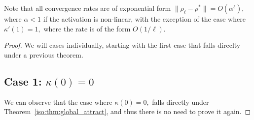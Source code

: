 \begin{remark}
Note that all convergence rates are of exponential form $\|\rho_\ell-\rho^*\|= O(\alpha^\ell),$ where $\alpha<1$ if the activation is non-linear, with the exception of the case where $\kappa'(1)=1,$ where the rate is of the form $O(1/\ell).$ 
\end{remark}

\begin{proof}
We will cases individually, starting with the first case that falls direclty under a previous theorem. 

\subsection*{Case 1: $\kappa(0)=0$}
We can observe that the case where $\kappa(0)=0,$ falls directly under Theorem~\ref{iso:thm:global_attract}, and thus there is no need to prove it again.


\end{proof}
